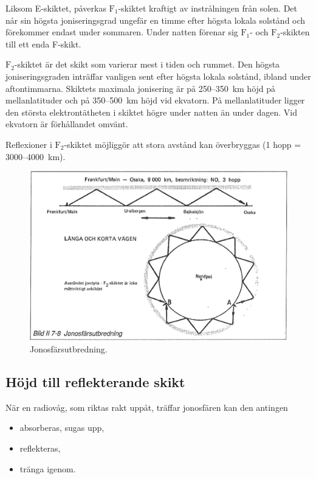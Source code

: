 Liksom E-skiktet, påverkas \(\mathrm{F_1}\)-skiktet kraftigt av
instrålningen från solen. Det når sin högsta joniseringsgrad ungefär
en timme efter högsta lokala solstånd och förekommer endast under
sommaren. Under natten förenar sig \(\mathrm{F_1}\)- och
\(\mathrm{F_2}\)-skikten till ett enda F-skikt.

\(\mathrm{F_2}\)-skiktet är det skikt som varierar mest i tiden och rummet.
Den högsta joniseringsgraden inträffar vanligen sent efter högsta lokala
solstånd, ibland under aftontimmarna.
Skiktets maximala jonisering är på 250--350~km höjd på mellanlatituder och på
350--500~km höjd vid ekvatorn.
På mellanlatituder ligger den största elektrontätheten i skiktet högre under
natten än under dagen.
Vid ekvatorn är förhållandet omvänt.

Reflexioner i \(\mathrm{F_2}\)-skiktet möjliggör att stora
avstånd kan överbryggas (1 hopp = 3000--4000~km).

\begin{figure}
  \includegraphics[width=\textwidth]{images/bild_2_7-08}
  \caption{Jonosfärsutbredning.}
  \label{fig:bildII7-8}
\end{figure}

\subsection{Höjd till reflekterande skikt}

När en radiovåg, som riktas rakt uppåt, träffar jonosfären kan den antingen
\begin{itemize}
\item absorberas, sugas upp,
\item reflekteras,
\item tränga igenom.
\end{itemize}

